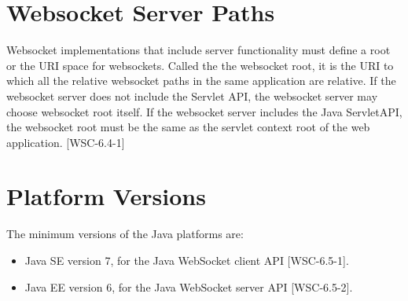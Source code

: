 \section{Websocket Server Paths}

Websocket implementations that include server functionality must define a root or the URI space for websockets. Called the the websocket root, it is the URI to which all the relative websocket paths in the same application are relative. If the websocket server does not include the Servlet API, the websocket server may choose websocket root itself. If the websocket server includes the Java ServletAPI, the websocket root must be the same as the servlet context root of the web application. [WSC-6.4-1]

\section{Platform Versions}

The minimum versions of the Java platforms are:

\begin{itemize}
	\item Java SE version 7, for the Java WebSocket client API [WSC-6.5-1].
	\item Java EE version 6, for the Java WebSocket server API [WSC-6.5-2].
\end{itemize}
